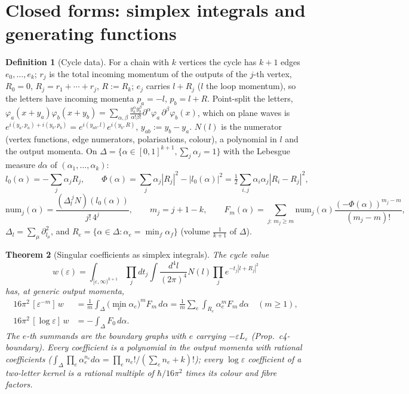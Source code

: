 \documentclass[11pt]{article}
\numberwithin{equation}{section}
\theoremstyle{plain}
\newtheorem{theorem}{Theorem}[section]
\theoremstyle{definition}
\newtheorem{definition}[theorem]{Definition}
\begin{document}
\section{Closed forms: simplex integrals and generating functions}
\label{sec:tl-closed}

\begin{definition}[Cycle data]
\label{def:tl-cycle}
For a chain with $k$ vertices the cycle has $k+1$ edges $e_0,\dots,e_k$; $r_j$ is the total incoming momentum of the outputs of the $j$-th vertex, $R_0=0$, $R_j=r_1+\cdots+r_j$, $R:=R_k$; $e_j$ carries $l+R_j$ ($l$ the loop momentum), so the letters have incoming momenta $p_a=-l$, $p_b=l+R$. Point-split the letters, $\varphi_a(x+y_a)\varphi_b(x+y_b)=\sum_{\alpha,\beta}\frac{y_a^\alpha y_b^\beta}{\alpha!\beta!}\partial^\alpha\varphi_a\,\partial^\beta\varphi_b(x)$, which on plane waves is $e^{i(y_a,p_a)+i(y_b,p_b)}=e^{i(y_{ab},l)}e^{i(y_b,R)}$, $y_{ab}:=y_b-y_a$. $N(l)$ is the numerator (vertex functions, edge numerators, polarisations, colour), a polynomial in $l$ and the output momenta. On $\Delta=\{\alpha\in[0,1]^{k+1},\sum_j\alpha_j=1\}$ with the Lebesgue measure $d\alpha$ of $(\alpha_1,\dots,\alpha_k)$:
\[
l_0(\alpha)=-\sum_j\alpha_jR_j,\qquad \Phi(\alpha)=\sum_j\alpha_j|R_j|^2-|l_0(\alpha)|^2=\tfrac12\sum_{i,j}\alpha_i\alpha_j|R_i-R_j|^2,
\]
\[
\mathrm{num}_j(\alpha)=\frac{(\Delta_l^{\,j}N)(l_0(\alpha))}{j!\,4^j},\qquad m_j=j+1-k,\qquad F_m(\alpha)=\sum_{j:\,m_j\ge m}\mathrm{num}_j(\alpha)\frac{(-\Phi(\alpha))^{m_j-m}}{(m_j-m)!},
\]
$\Delta_l=\sum_\mu\partial^2_{l_\mu}$, and $R_e=\{\alpha\in\Delta:\alpha_e=\min_f\alpha_f\}$ (volume $\frac1{k+1}$ of $\Delta$).
\end{definition}

\begin{theorem}[Singular coefficients as simplex integrals]
\label{thm:tl-simplex}
The cycle value
\[
w(\varepsilon)=\int_{[\varepsilon,\infty)^{k+1}}\prod_jdt_j\int\frac{d^4l}{(2\pi)^4}N(l)\prod_je^{-t_j|l+R_j|^2}
\]
has, at generic output momenta,
\begin{equation}
\begin{aligned}16\pi^2\,[\varepsilon^{-m}]\,w&=\frac1m\int_\Delta\big(\min_e\alpha_e\big)^mF_m\,d\alpha=\frac1m\sum_e\int_{R_e}\alpha_e^mF_m\,d\alpha\quad(m\ge1),\\ 16\pi^2\,[\log\varepsilon]\,w&=-\int_\Delta F_0\,d\alpha .\end{aligned}
\label{eq:tl-simplex}
\end{equation}
The $e$-th summands are the boundary graphs with $e$ carrying $-\varepsilon L_\varepsilon$ (Prop.~c4-boundary). Every coefficient is a polynomial in the output momenta with rational coefficients ($\int_\Delta\prod_e\alpha_e^{n_e}d\alpha=\prod_en_e!/(\sum_en_e+k)!$); every $\log\varepsilon$ coefficient of a two-letter kernel is a rational multiple of $\hbar/16\pi^2$ times its colour and fibre factors.
\end{theorem}
\end{document}
